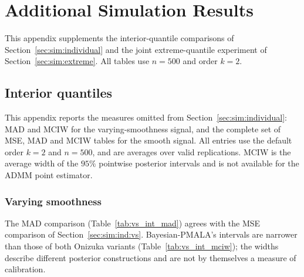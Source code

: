 \section{Additional Simulation Results}
\label{app:simulation_results}

This appendix supplements the interior-quantile comparisons of Section~\ref{sec:sim:individual} and the joint extreme-quantile experiment of Section~\ref{sec:sim:extreme}. All tables use $n=500$ and order $k=2$.

\subsection{Interior quantiles}
\label{app:sim:individual}

This appendix reports the measures omitted from Section~\ref{sec:sim:individual}: MAD and MCIW for the varying-smoothness signal, and the complete set of MSE, MAD and MCIW tables for the smooth signal. All entries use the default order $k=2$ and $n=500$, and are averages over valid replications. MCIW is the average width of the $95\%$ pointwise posterior intervals and is not available for the ADMM point estimator.

\subsubsection{Varying smoothness}
\label{app:sim:individual:vs}
The MAD comparison (Table~\ref{tab:vs_int_mad}) agrees with the MSE comparison of Section~\ref{sec:sim:ind:vs}. Bayesian-PMALA's intervals are narrower than those of both Onizuka variants (Table~\ref{tab:vs_int_mciw}); the widths describe different posterior constructions and are not by themselves a measure of calibration.

